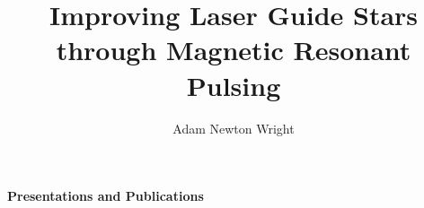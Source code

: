 \documentclass[12pt]{report}
\begin{document}
\title{Improving Laser Guide Stars through Magnetic Resonant Pulsing}
\author{Adam Newton Wright}


\newpage

\maketitle

\newpage







\begin{center}
\textbf{Presentations and Publications}\\
\end{center}
\end{document}
